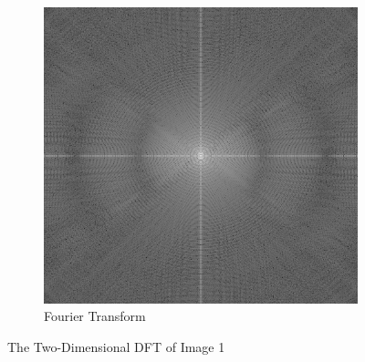 \documentclass{amsproc}
\begin{document}
\begin{figure}[h]
\begin{subfigure}{.4\textwidth}
	\includegraphics[scale=.3]{images/2ddft1.png}
	\caption{Fourier Transform}
	\label{fig:sub12}
\end{subfigure}
\caption{The Two-Dimensional DFT of Image 1}
\label{fig:im3}
\end{figure}
\end{document}

